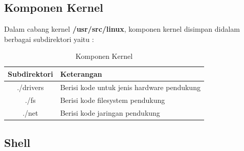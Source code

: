 \subsection{Komponen Kernel}
Dalam cabang kernel \textbf{/usr/src/linux}, komponen kernel disimpan didalam berbagai subdirektori yaitu :
 \begin{table}[h]
		\caption{Komponen Kernel}
		\label{Komponen kernel}
			\begin{tabular}{|c|l|}
			\hline
			Subdirektori&Keterangan\\
			\hline
			./drivers& Berisi kode untuk jenis hardware pendukung\\
			\hline
			./fs& Berisi kode filesystem pendukung\\
			\hline
			./net& Berisi kode jaringan pendukung\\
			\hline
		\end{tabular}
		\end{table}

\subsection{Shell}
